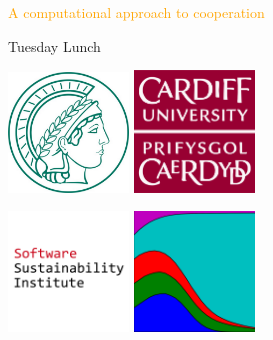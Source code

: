 \documentclass{beamer}
\begin{document}
\begin{frame}
    \begin{center}
        \Large{\textcolor{orange}{A computational approach to cooperation}} \\
        \vspace{.5cm}

        \vspace{1cm}
        \normalsize{Tuesday Lunch} \\
        \vspace{.5cm}

    \end{center}
\end{frame}


\begin{frame}
    \begin{center}
    \includegraphics[width=0.24\textwidth]{static/mpi.jpg}\hspace{8pt}
    \includegraphics[width=0.24\textwidth]{static/cardiff_uni_logo.png}\vspace{8pt}

    \includegraphics[width=0.24\textwidth]{static/ssi-logo.png}\hspace{8pt}
    \includegraphics[width=0.24\textwidth]{static/axelrod-logo.png}
    \end{center}
\end{frame}
\end{document}
